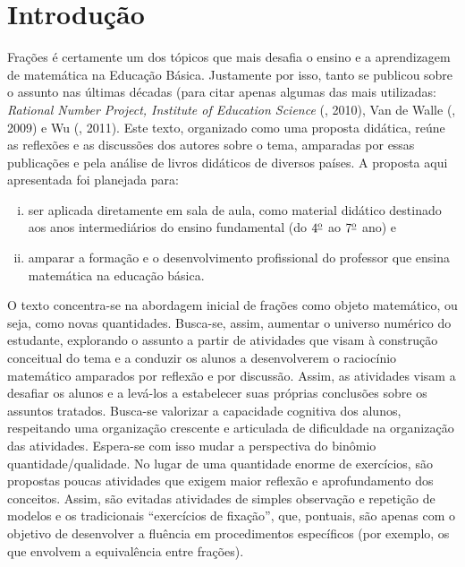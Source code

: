 
%
%
% 

\setcounter{chapter}{-1}
\chapter{Introdução}



Frações é certamente um dos tópicos que mais desafia o ensino e a aprendizagem de matemática na Educação Básica. Justamente por isso, tanto se publicou sobre o assunto nas últimas décadas (para citar apenas algumas das mais utilizadas:  {\it Rational Number Project, Institute of Education Science} (\cite{IES}, 2010), Van de Walle (\cite{Walle}, 2009) e Wu (\cite{Wu}, 2011). Este texto, organizado como uma proposta didática,  reúne as reflexões e as discussões dos autores sobre o tema, amparadas por essas publicações e pela análise de livros didáticos de diversos países. A proposta aqui apresentada foi planejada para:

\begin{enumerate}[(i)]
\item  ser aplicada diretamente em sala de aula, como material didático destinado aos anos intermediários do ensino fundamental (do $4^{\textrm{\underline{o}}}$ ao $7^{\textrm{\underline{o}}}$ ano) e
\item amparar a formação e o desenvolvimento profissional do professor que ensina matemática na educação básica.
\end{enumerate}

O texto concentra-se na abordagem inicial de frações como objeto matemático, ou seja, como novas quantidades. Busca-se, assim, aumentar o universo numérico do estudante, explorando o assunto a partir de atividades que visam à construção conceitual do tema e a conduzir os alunos a desenvolverem o raciocínio matemático amparados por reflexão e por discussão. Assim, as atividades visam a desafiar os alunos e a levá-los a estabelecer suas próprias conclusões sobre os assuntos tratados. Busca-se valorizar a capacidade cognitiva dos alunos, respeitando uma organização crescente e articulada de dificuldade na organização das atividades. Espera-se com isso mudar a perspectiva do binômio quantidade/qualidade. No lugar de uma quantidade enorme de exercícios, são propostas poucas  atividades que exigem maior reflexão e aprofundamento dos conceitos. Assim, são evitadas atividades de simples observação e repetição de modelos e os tradicionais ``exercícios de fixação'', que, pontuais, são apenas com o objetivo de desenvolver a fluência em procedimentos específicos (por exemplo, os que envolvem a equivalência entre frações).

